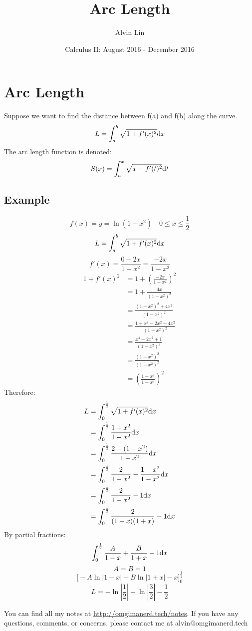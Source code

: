 \documentclass[letterpaper, 12pt]{math}
\title{Arc Length}
\author{Alvin Lin}
\date{Calculus II: August 2016 - December 2016}
\begin{document}
\maketitle

\section*{Arc Length}
\begin{center}
\end{center}
Suppose we want to find the distance between f(a) and f(b) along the curve.
\[ L = \int_{a}^{b}{\sqrt{1+f'(x)^{2}}\mathrm{d}{x}} \]
The arc length function is denoted:
\[ S(x) = \int_{a}^{x}{\sqrt{x+f'(t)^{2}}\mathrm{d}{t}} \]

\subsection*{Example}
\[ f(x) = y = \ln(1-x^{2}) \quad 0 \leq x \leq \frac{1}{2} \]
\[ L = \int_{a}^{b}{\sqrt{1+f'(x)^{2}}\mathrm{d}{x}} \]
\[ f'(x) = \frac{0-2x}{1-x^{2}} = \frac{-2x}{1-x^{2}} \]
\begin{align*}
  1 + f'(x)^{2} &= 1+(\frac{-2x}{1-x^{2}})^{2} \\
  &= 1+\frac{4x}{(1-x^{2})^{2}} \\
  &= \frac{(1-x^{2})^{2}+4x^{2}}{(1-x^{2})^{2}} \\
  &= \frac{1+x^{4}-2x^{2}+4x^{2}}{(1-x^{2})^{2}} \\
  &= \frac{x^{4}+2x^{2}+1}{(1-x^{2})^{2}} \\
  &= \frac{(1+x^{2})^{2}}{(1-x^{2})^{2}} \\
  &= (\frac{1+x^{2}}{1-x^{2}})^{2}
\end{align*}
Therefore:
\begin{align*}
  L &= \int_{0}^{\frac{1}{2}}{\sqrt{1+f'(x)^{2}}\mathrm{d}{x}} \\
  &= \int_{0}^{\frac{1}{2}}{\frac{1+x^{2}}{1-x^{2}}\mathrm{d}{x}} \\
  &= \int_{0}^{\frac{1}{2}}{\frac{2-(1-x^{2})}{1-x^{2}}\mathrm{d}{x}} \\
  &= \int_{0}^{\frac{1}{2}}{\frac{2}{1-x^{2}}-
     \frac{1-x^{2}}{1-x^{2}}\mathrm{d}{x}} \\
  &= \int_{0}^{\frac{1}{2}}{\frac{2}{1-x^{2}}-1\mathrm{d}{x}} \\
  &= \int_{0}^{\frac{1}{2}}{\frac{2}{(1-x)(1+x)}-1\mathrm{d}{x}}
\end{align*}
By partial fractions:
\[ \int_{0}^{\frac{1}{2}}{\frac{A}{1-x}+\frac{B}{1+x}-1\mathrm{d}{x}} \]
\[ A = B = 1 \]
\[ \bigg[-A\ln|1-x|+B\ln|1+x|-x\bigg]_{0}^{\frac{1}{2}} \]
\[ L = -\ln|\frac{1}{2}|+\ln|\frac{3}{2}|-\frac{1}{2} \]

\begin{center}
  You can find all my notes at \url{http://omgimanerd.tech/notes}. If you have
  any questions, comments, or concerns, please contact me at
  alvin@omgimanerd.tech
\end{center}
\end{document}
